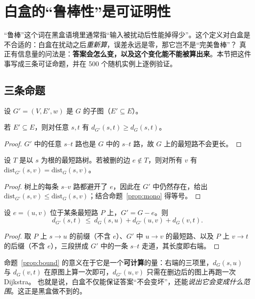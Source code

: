 ﻿\section{白盒的“鲁棒性”是可证明性}\label{sec:robust}

“鲁棒”这个词在黑盒语境里通常指“输入被扰动后性能掉得少”。这个定义对白盒是不合适的：白盒在扰动之后\emph{重新算}，误差永远是零，那它岂不是“完美鲁棒”？
真正有信息量的问法是：\textbf{答案会怎么变，以及这个变化能不能被算出来}。本节把这件事写成三条可证命题，并在 500 个随机实例上逐例验证。

\subsection{三条命题}

设 $G'=(V,E',w)$ 是 $G$ 的子图（$E'\subseteq E$）。

\begin{proposition}[删边单调性]\label{prop:mono}
若 $E'\subseteq E$，则对任意 $s,t$ 有 $d_{G'}(s,t)\ge d_G(s,t)$。
\end{proposition}
\begin{proof}
$G'$ 中的任意 $s$--$t$ 路也是 $G$ 中的 $s$--$t$ 路，故 $G$ 上的最短路不会更长。
\end{proof}

\begin{proposition}[非树边不变性]\label{prop:nontree}
设 $T$ 是以 $s$ 为根的最短路树。若被删的边 $e\notin T$，则对所有 $v$ 有 $\mathrm{dist}_{G'}(s,v)=\mathrm{dist}_G(s,v)$。
\end{proposition}
\begin{proof}
树上的每条 $s$--$v$ 路都避开了 $e$，因此在 $G'$ 中仍然存在，给出 $\mathrm{dist}_{G'}(s,v)\le \mathrm{dist}_G(s,v)$；结合命题~\ref{prop:mono} 得等号。
\end{proof}

\begin{proposition}[单边删除的可计算上界]\label{prop:bound}
设 $e=(u,v)$ 位于某条最短路 $P$ 上，$G'=G-e$。则
\begin{equation}
d_{G'}(s,t)\ \le\ d_G(s,u)+d_{G'}(u,v)+d_G(v,t).
\label{eq:bound}
\end{equation}
\end{proposition}
\begin{proof}
取 $P$ 上 $s\to u$ 的前缀（不含 $e$）、$G'$ 中 $u\to v$ 的最短路、以及 $P$ 上 $v\to t$ 的后缀（不含 $e$），三段拼成 $G'$ 中的一条 $s$--$t$ 走道，其长度即右端。
\end{proof}

命题~\ref{prop:bound} 的意义在于它是一个\textbf{可计算}的量：右端的三项里，$d_G(s,u)$ 与 $d_G(v,t)$ 在原图上算一次即可，$d_{G'}(u,v)$ 只需在删边后的图上再跑一次 Dijkstra。
也就是说，白盒不仅能保证答案“不会变坏”，还能\emph{说出它会变成什么范围}。这正是黑盒做不到的。

